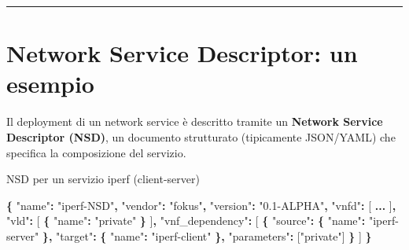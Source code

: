 \documentclass[
  italian,
  openany]{book}
\newenvironment{Shaded}{\begin{snugshade}}{\end{snugshade}}
\newcommand{\DataTypeTok}[1]{\textcolor[rgb]{0.13,0.29,0.53}{#1}}
\newcommand{\ErrorTok}[1]{\textcolor[rgb]{0.64,0.00,0.00}{\textbf{#1}}}
\newcommand{\FunctionTok}[1]{\textcolor[rgb]{0.13,0.29,0.53}{\textbf{#1}}}
\newcommand{\OtherTok}[1]{\textcolor[rgb]{0.56,0.35,0.01}{#1}}
\newcommand{\StringTok}[1]{\textcolor[rgb]{0.31,0.60,0.02}{#1}}
\begin{document}
\begin{center}\rule{0.5\linewidth}{0.5pt}\end{center}

\section{Network Service Descriptor: un
esempio}\label{network-service-descriptor-un-esempio}

Il deployment di un network service è descritto tramite un
\textbf{Network Service Descriptor (NSD)}, un documento strutturato
(tipicamente JSON/YAML) che specifica la composizione del servizio.

\begin{callouttip}{NSD per un servizio iperf (client-server)}

\begin{Shaded}
\begin{Highlighting}[]
\FunctionTok{\{}
  \DataTypeTok{"name"}\FunctionTok{:} \StringTok{"iperf{-}NSD"}\FunctionTok{,}
  \DataTypeTok{"vendor"}\FunctionTok{:} \StringTok{"fokus"}\FunctionTok{,}
  \DataTypeTok{"version"}\FunctionTok{:} \StringTok{"0.1{-}ALPHA"}\FunctionTok{,}
  \DataTypeTok{"vnfd"}\FunctionTok{:} \OtherTok{[} \ErrorTok{...} \OtherTok{]}\FunctionTok{,}
  \DataTypeTok{"vld"}\FunctionTok{:} \OtherTok{[} \FunctionTok{\{} \DataTypeTok{"name"}\FunctionTok{:} \StringTok{"private"} \FunctionTok{\}} \OtherTok{]}\FunctionTok{,}
  \DataTypeTok{"vnf\_dependency"}\FunctionTok{:} \OtherTok{[}
    \FunctionTok{\{}
      \DataTypeTok{"source"}\FunctionTok{:} \FunctionTok{\{} \DataTypeTok{"name"}\FunctionTok{:} \StringTok{"iperf{-}server"} \FunctionTok{\},}
      \DataTypeTok{"target"}\FunctionTok{:} \FunctionTok{\{} \DataTypeTok{"name"}\FunctionTok{:} \StringTok{"iperf{-}client"} \FunctionTok{\},}
      \DataTypeTok{"parameters"}\FunctionTok{:} \OtherTok{[}\StringTok{"private"}\OtherTok{]}
    \FunctionTok{\}}
  \OtherTok{]}
\FunctionTok{\}}
\end{Highlighting}
\end{Shaded}


\end{callouttip}
\end{document}

